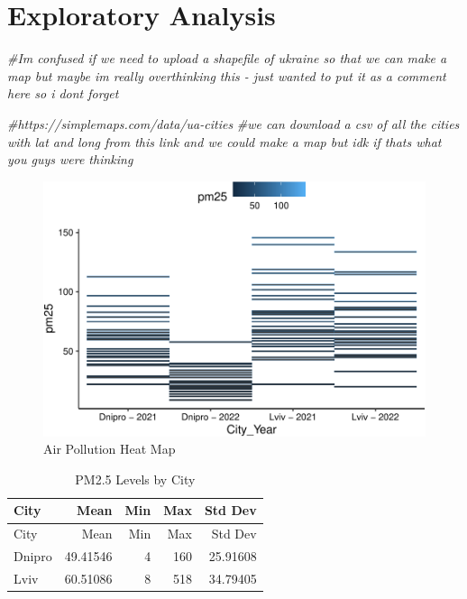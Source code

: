 \documentclass[
  12pt,
]{article}
\newenvironment{Shaded}{\begin{snugshade}}{\end{snugshade}}
\newcommand{\CommentTok}[1]{\textcolor[rgb]{0.56,0.35,0.01}{\textit{#1}}}
\begin{document}
\newpage

\hypertarget{exploratory-analysis}{%
\section{Exploratory Analysis}\label{exploratory-analysis}}

\begin{Shaded}
\begin{Highlighting}[]
\CommentTok{\#I\textquotesingle{}m confused if we need to upload a shapefile of ukraine so that we can make a map but maybe im really overthinking this {-} just wanted to put it as a comment here so i dont forget }

\CommentTok{\#https://simplemaps.com/data/ua{-}cities}
\CommentTok{\#we can download a csv of all the cities with lat and long from this link and we could make a map but idk if thats what you guys were thinking}
\end{Highlighting}
\end{Shaded}

\begin{figure}
\centering
\includegraphics{Fontanie_Gordon_Weinberg_Project_files/figure-latex/heat map of air pollution-1.pdf}
\caption{Air Pollution Heat Map}
\end{figure}

\begin{longtable}[]{@{}lrrrr@{}}
\caption{PM2.5 Levels by City}\tabularnewline
\toprule
City & Mean & Min & Max & Std Dev \\
\midrule
\endfirsthead
\toprule
City & Mean & Min & Max & Std Dev \\
\midrule
\endhead
Dnipro & 49.41546 & 4 & 160 & 25.91608 \\
Lviv & 60.51086 & 8 & 518 & 34.79405 \\
\bottomrule
\end{longtable}
\end{document}
